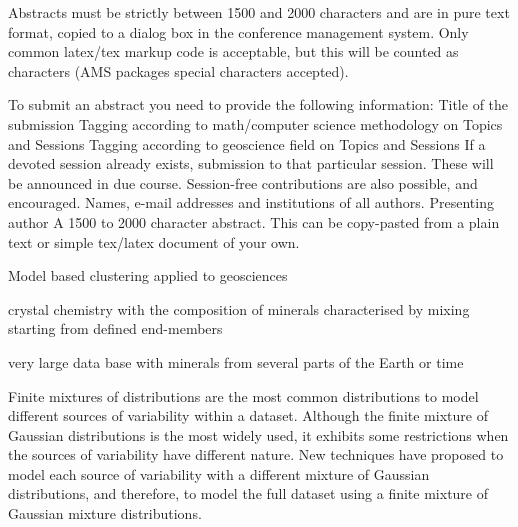 Abstracts must be strictly between 1500 and 2000 characters and are in pure text format, copied to a dialog box in the conference management system. Only common latex/tex markup code is acceptable, but this will be counted as characters (AMS packages special characters accepted).

To submit an abstract you need to provide the following information:
Title of the submission
Tagging according to math/computer science methodology on Topics and Sessions
Tagging according to geoscience field on Topics and Sessions
If a devoted session already exists, submission to that particular session. These will be announced in due course. Session-free contributions are also possible, and encouraged.
Names, e-mail addresses and institutions of all authors.
Presenting author
A 1500 to 2000 character abstract. This can be copy-pasted from a plain text or simple tex/latex document of your own.


Model based clustering applied to geosciences

 crystal chemistry with the composition of minerals characterised by mixing starting from defined end-members

very large data base with minerals from several parts of the Earth or time


Finite mixtures of distributions are the most common distributions to model different sources of variability within a dataset. Although the finite mixture of Gaussian distributions is the most widely used, it exhibits some restrictions when the sources of variability have different nature. New techniques have proposed to model each source of variability with a different mixture of Gaussian distributions, and therefore, to model the full dataset using a finite mixture of Gaussian mixture distributions.

